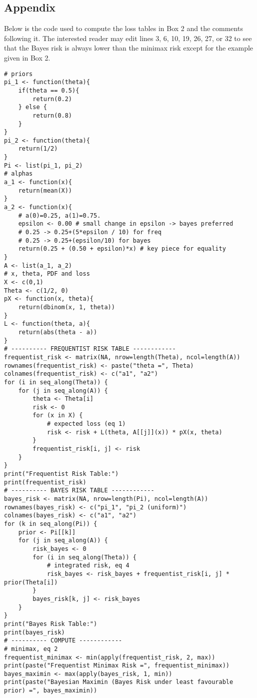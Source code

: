 \documentclass[letterpaper,12pt]{article}
\begin{document}
\subsection*{Appendix}
Below is the code used to compute the loss tables in Box 2 and the comments following it. The interested reader may edit lines 3, 6, 10,  19, 26, 27, or 32 to see that the Bayes risk is always lower than the minimax risk except for the example given in Box 2. 
\begin{lstlisting}
# priors
pi_1 <- function(theta){
	if(theta == 0.5){
		return(0.2)
	} else {
		return(0.8)
	}
}
pi_2 <- function(theta){
	return(1/2)
}
Pi <- list(pi_1, pi_2)
# alphas
a_1 <- function(x){
	return(mean(X))
}
a_2 <- function(x){
	# a(0)=0.25, a(1)=0.75.
	epsilon <- 0.00 # small change in epsilon -> bayes preferred
	# 0.25 -> 0.25+(5*epsilon / 10) for freq
	# 0.25 -> 0.25+(epsilon/10) for bayes
	return(0.25 + (0.50 + epsilon)*x) # key piece for equality
}
A <- list(a_1, a_2)
# x, theta, PDF and loss
X <- c(0,1)
Theta <- c(1/2, 0)
pX <- function(x, theta){
	return(dbinom(x, 1, theta))
}
L <- function(theta, a){
	return(abs(theta - a))
}
# ---------- FREQUENTIST RISK TABLE ------------
frequentist_risk <- matrix(NA, nrow=length(Theta), ncol=length(A))
rownames(frequentist_risk) <- paste("theta =", Theta)
colnames(frequentist_risk) <- c("a1", "a2")
for (i in seq_along(Theta)) {
	for (j in seq_along(A)) {
		theta <- Theta[i]
		risk <- 0
		for (x in X) {
			# expected loss (eq 1)
			risk <- risk + L(theta, A[[j]](x)) * pX(x, theta)
		}
		frequentist_risk[i, j] <- risk
	}
}
print("Frequentist Risk Table:")
print(frequentist_risk)
# ---------- BAYES RISK TABLE ------------
bayes_risk <- matrix(NA, nrow=length(Pi), ncol=length(A))
rownames(bayes_risk) <- c("pi_1", "pi_2 (uniform)")
colnames(bayes_risk) <- c("a1", "a2")
for (k in seq_along(Pi)) {
	prior <- Pi[[k]]
	for (j in seq_along(A)) {
		risk_bayes <- 0
		for (i in seq_along(Theta)) {
			# integrated risk, eq 4
			risk_bayes <- risk_bayes + frequentist_risk[i, j] * prior(Theta[i])
		}
		bayes_risk[k, j] <- risk_bayes
	}
}
print("Bayes Risk Table:")
print(bayes_risk)
# ---------- COMPUTE ------------
# minimax, eq 2
frequentist_minimax <- min(apply(frequentist_risk, 2, max))
print(paste("Frequentist Minimax Risk =", frequentist_minimax))
bayes_maximin <- max(apply(bayes_risk, 1, min))
print(paste("Bayesian Maximin (Bayes Risk under least favourable prior) =", bayes_maximin))
\end{lstlisting}
\end{document}
